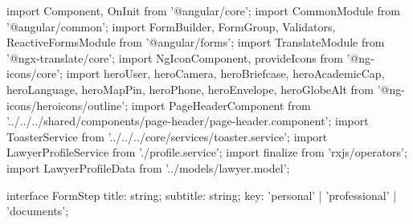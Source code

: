 import { Component, OnInit } from '@angular/core';
import { CommonModule } from '@angular/common';
import { FormBuilder, FormGroup, Validators, ReactiveFormsModule } from '@angular/forms';
import { TranslateModule } from '@ngx-translate/core';
import { NgIconComponent, provideIcons } from '@ng-icons/core';
import { 
  heroUser,
  heroCamera,
  heroBriefcase,
  heroAcademicCap,
  heroLanguage,
  heroMapPin,
  heroPhone,
  heroEnvelope,
  heroGlobeAlt
} from '@ng-icons/heroicons/outline';
import { PageHeaderComponent } from '../../../shared/components/page-header/page-header.component';
import { ToasterService } from '../../../core/services/toaster.service';
import { LawyerProfileService } from './profile.service';
import { finalize } from 'rxjs/operators';
import { LawyerProfileData } from '../models/lawyer.model';

interface FormStep {
  title: string;
  subtitle: string;
  key: 'personal' | 'professional' | 'documents';
}


